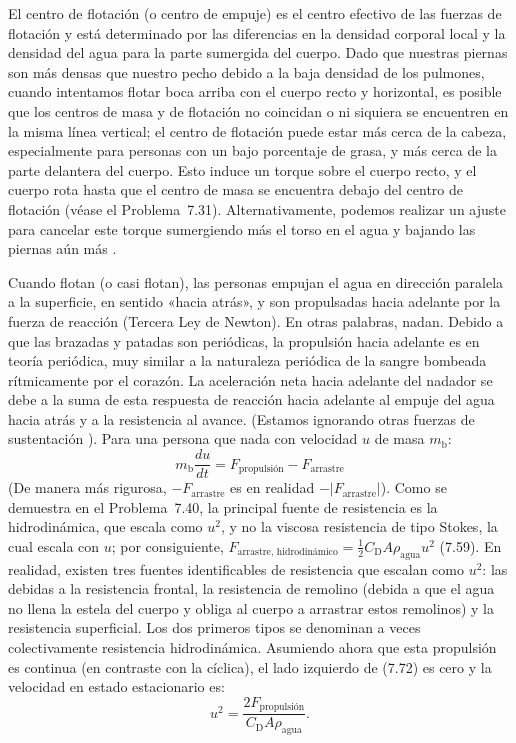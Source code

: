 \documentclass[12pt]{book}
\begin{document}
El centro de flotación (o centro de empuje) es el centro efectivo de las fuerzas de flotación y está determinado por las diferencias en la densidad corporal local y la densidad del agua para la parte sumergida del cuerpo. Dado que nuestras piernas son más densas que nuestro pecho debido a la baja densidad de los pulmones, cuando intentamos flotar boca arriba con el cuerpo recto y horizontal, es posible que los centros de masa y de flotación no coincidan o ni siquiera se encuentren en la misma línea vertical; el centro de flotación puede estar más cerca de la cabeza, especialmente para personas con un bajo porcentaje de grasa, y más cerca de la parte delantera del cuerpo. Esto induce un torque sobre el cuerpo recto, y el cuerpo rota hasta que el centro de masa se encuentra debajo del centro de flotación (véase el Problema~7.31). Alternativamente, podemos realizar un ajuste para cancelar este torque sumergiendo más el torso en el agua y bajando las piernas aún más \cite{16}.

Cuando flotan (o casi flotan), las personas empujan el agua en dirección paralela a la superficie, en sentido «hacia atrás», y son propulsadas hacia adelante por la fuerza de reacción (Tercera Ley de Newton). En otras palabras, nadan. Debido a que las brazadas y patadas son periódicas, la propulsión hacia adelante es en teoría periódica, muy similar a la naturaleza periódica de la sangre bombeada rítmicamente por el corazón. La aceleración neta hacia adelante del nadador se debe a la suma de esta respuesta de reacción hacia adelante al empuje del agua hacia atrás y a la resistencia al avance. (Estamos ignorando otras fuerzas de sustentación \cite{1,5,17}). Para una persona que nada con velocidad $u$ de masa $m_{\text{b}}$:
\begin{equation}
m_{\text{b}} \frac{du}{dt} = F_{\text{propulsión}} - F_{\text{arrastre}}
\label{eq:772}
\end{equation}
(De manera más rigurosa, $-F_{\text{arrastre}}$ es en realidad $-|F_{\text{arrastre}}|$). Como se demuestra en el Problema~7.40, la principal fuente de resistencia es la hidrodinámica, que escala como $u^2$, y no la viscosa resistencia de tipo Stokes, la cual escala con $u$; por consiguiente, $F_{\text{arrastre, hidrodinámico}} = \frac{1}{2} C_{\text{D}} A \rho_{\text{agua}} u^2$ (7.59). En realidad, existen tres fuentes identificables de resistencia que escalan como $u^2$: las debidas a la resistencia frontal, la resistencia de remolino (debida a que el agua no llena la estela del cuerpo y obliga al cuerpo a arrastrar estos remolinos) y la resistencia superficial. Los dos primeros tipos se denominan a veces colectivamente resistencia hidrodinámica. Asumiendo ahora que esta propulsión es continua (en contraste con la cíclica), el lado izquierdo de (7.72) es cero y la velocidad en estado estacionario es:
\begin{equation}
u^2 = \frac{2F_{\text{propulsión}}}{C_{\text{D}} A \rho_{\text{agua}}}.
\label{eq:773}
\end{equation}
\end{document}

